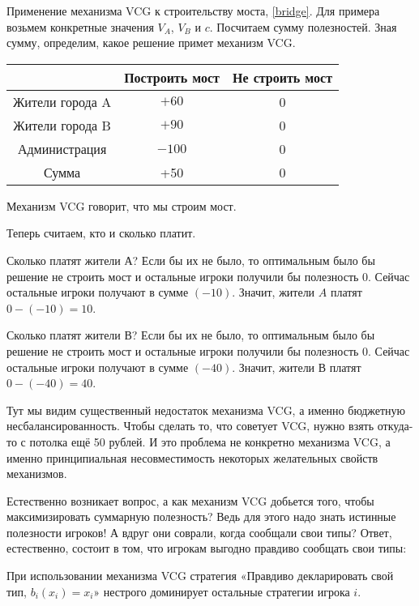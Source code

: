 \begin{myex}
Применение механизма VCG к строительству моста, \ref{bridge}. Для примера возьмем конкретные значения $ V_{A} $, $ V_{B} $ и $ c $. Посчитаем сумму полезностей. Зная сумму, определим, какое решение примет механизм VCG.

\begin{tabular}{c|cc}
& Построить мост & Не строить мост \\
\hline
Жители города A & $ +60 $ & 0 \\
Жители города B & $ +90 $ & 0 \\
Администрация & $-100 $ & 0 \\
Сумма & +50 & 0 \\
\end{tabular}

Механизм VCG говорит, что мы строим мост.

Теперь считаем, кто и сколько платит.

Сколько платят жители А? Если бы их не было, то оптимальным было бы решение не строить мост и остальные игроки получили бы полезность 0. Сейчас остальные игроки получают в сумме $ (-10) $. Значит, жители $ A $ платят $ 0-(-10)=10 $.

Сколько платят жители В? Если бы их не было, то оптимальным было бы решение не строить мост и остальные игроки получили бы полезность 0. Сейчас остальные игроки получают в сумме $ (-40) $. Значит, жители В платят $ 0-(-40)=40 $.

Тут мы видим существенный недостаток механизма VCG, а именно бюджетную несбалансированность. Чтобы сделать то, что советует VCG, нужно взять откуда-то с потолка ещё 50 рублей. И это проблема не конкретно механизма VCG, а именно принципиальная несовместимость некоторых желательных свойств механизмов.
\end{myex}

Естественно возникает вопрос, а как механизм VCG добьется того, чтобы максимизировать суммарную полезность? Ведь для этого надо знать истинные полезности игроков! А вдруг они соврали, когда сообщали свои типы? Ответ, естественно, состоит в том, что игрокам выгодно правдиво сообщать свои типы:

\begin{myth}
При использовании механизма VCG стратегия «Правдиво декларировать свой тип, $ b_{i}(x_{i})=x_{i} $» нестрого доминирует остальные стратегии игрока $ i $.
\end{myth}


